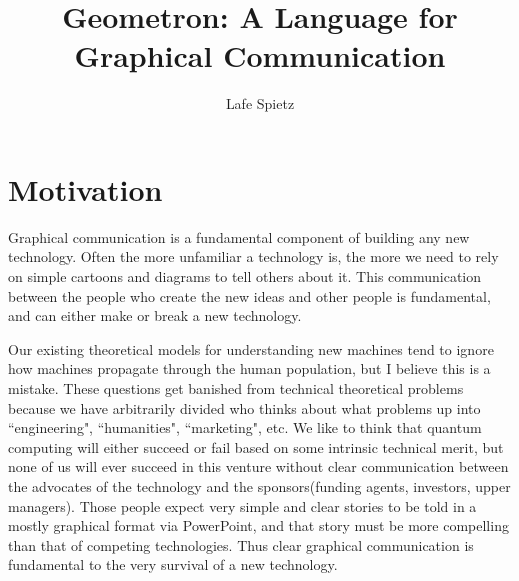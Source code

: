 \documentclass[11pt]{article}
\begin{document}
\title{Geometron: A Language for Graphical Communication}
\author{Lafe Spietz}


\section{Motivation}

    Graphical communication is a fundamental component of building any new technology.  Often the more unfamiliar a technology is, the more we need to rely on simple cartoons and diagrams to tell others about it.  This communication between the people who create the new ideas and other people is fundamental, and can either make or break a new technology.   

    Our existing theoretical models for understanding new machines tend to ignore how machines propagate through the human population, but I believe this is a mistake.  These questions get banished from technical theoretical problems because we have arbitrarily divided who thinks about what problems up into ``engineering", ``humanities", ``marketing", etc.  We like to think that quantum computing will either succeed or fail based on some intrinsic technical merit, but none of us will ever succeed in this venture without clear communication between the advocates of the technology and the sponsors(funding agents, investors, upper managers).  Those people expect very simple and clear stories to be told in a mostly graphical format via PowerPoint, and that story must be more compelling than that of competing technologies.  Thus clear graphical communication is fundamental to the very survival of a new technology.  
\end{document}
